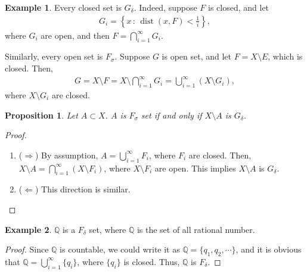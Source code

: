 \documentclass[11pt]{book}
\newtheorem{proposition}{Proposition}[chapter]
\theoremstyle{definition}
\newtheorem{example}{Example}[chapter]
\numberwithin{equation}{chapter}
\begin{document}
\begin{example}
Every closed set is $G_\delta$. Indeed, suppose $F$ is closed, and let
\begin{align*}
    G_i = \left\{x\,:\, \operatorname{dist}(x,F) < \frac{1}{i}\right\},
\end{align*}
where $G_i$ are open, and then $F = \bigcap^\infty_{i=1} G_i$.

Similarly, every open set is $F_\sigma$. Suppose $G$ is open set, and let $F = X \setminus E$, which is closed. Then,
\begin{align*}
    G = X \setminus F = X \setminus \bigcap^\infty_{i=1} G_i = \bigcup^\infty_{i=1} (X \setminus G_i),
\end{align*}
where $X \setminus G_i$ are closed.
\end{example}

\medskip

\begin{proposition}
Let $A \subset X$. $A$ is $F_\sigma$ set if and only if $X \setminus A$ is $G_\delta$.
\end{proposition}
\begin{proof}
~\begin{enumerate}[label=(\alph*)]
    \item ($\Rightarrow$) By assumption, $A = \bigcup^\infty_{i=1} F_i$, where $F_i$ are closed. Then, $X \setminus A = \bigcap^\infty_{i=1} (X \setminus F_i)$, where $X \setminus F_i$ are open. This implies $X \setminus A$ is $G_\delta$.
    
    \item ($\Leftarrow$) This direction is similar.
\end{enumerate}
\end{proof}

\medskip

\begin{example}
$\mathbb{Q}$ is a $F_\delta$ set, where $\mathbb{Q}$ is the set of all rational number.
\end{example}
\begin{proof}
Since $\mathbb{Q}$ is countable, we could write it as $\mathbb{Q} = \{q_1, q_2, \cdots\}$, and it is obvious that $\mathbb{Q} = \bigcup^\infty_{i=1} \{q_i\}$, where $\{q_i\}$ is closed. Thus, $\mathbb{Q}$ is $F_\delta$.
\end{proof}

\medskip
\end{document}
